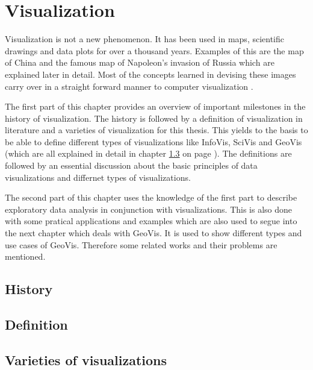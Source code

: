 \section{Visualization}
Visualization is not a new phenomenon. It has been used in maps, scientific drawings and data plots for over a thousand years. Examples of this are the map of China and the famous map of Napoleon's invasion of Russia which are explained later in detail. Most of the concepts learned in devising these images carry over in a straight forward manner to computer visualization .

The first part of this chapter provides an overview of important milestones in the history of visualization. The history is followed by a definition of visualization in literature and a varieties of visualization for this thesis. This yields to the basis to be able to define different types of visualizations like \ac{InfoVis}, \ac{SciVis} and \ac{GeoVis} (which are all explained in detail in chapter \ref{s:definitions-types} on page \pageref{s:definitions-types}). The definitions are followed by an essential discussion about the basic principles of data visualizations and differnet types of visualizations.

The second part of this chapter uses the knowledge of the first part to describe exploratory data analysis in conjunction with visualizations. This is also done with some pratical applications and examples which are also used to segue into the next chapter which deals with \ac{GeoVis}. It is used to show different types and use cases of \ac{GeoVis}. Therefore some related works and their problems are mentioned.

\subsection{History}
\label{s:history}


\subsection{Definition}
\label{s:definition}


\subsection{Varieties of visualizations}
\label{s:definitions-types}


